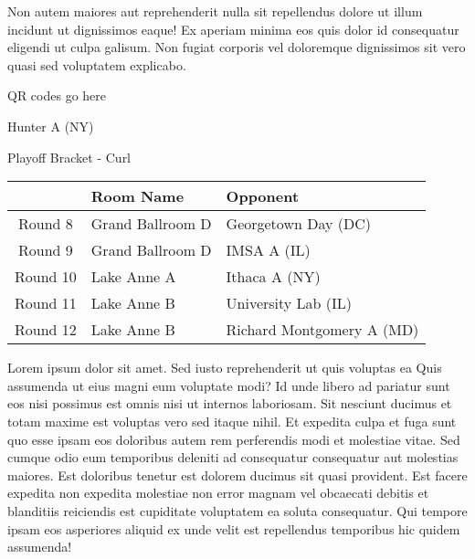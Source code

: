 \documentclass{article}%
\begin{document}
\newline%
Non autem maiores aut reprehenderit nulla sit repellendus dolore ut illum incidunt ut dignissimos eaque! Ex aperiam minima eos quis dolor id consequatur eligendi ut culpa galisum. Non fugiat corporis vel doloremque dignissimos sit vero quasi sed voluptatem explicabo.\newline%
\newline%
%
\vspace*{30pt}%
\begin{center}%
\begin{Huge}%
QR codes go here%
\end{Huge}%
\end{center}%
\newpage%
\begin{center}%
\begin{Huge}%
Hunter A (NY)%
\end{Huge}%
\vspace*{8pt}%
\linebreak%
\begin{Large}%
Playoff Bracket {-} Curl%
\end{Large}%
\end{center}%
\begin{tabularx}{\textwidth}{|c|Y|Y|}%
\hline%
&Room Name&Opponent\\%
\hline%
Round 8&Grand Ballroom D&Georgetown Day (DC)\\%
Round 9&Grand Ballroom D&IMSA A (IL)\\%
Round 10&Lake Anne A&Ithaca A (NY)\\%
Round 11&Lake Anne B&University Lab (IL)\\%
Round 12&Lake Anne B&Richard Montgomery A (MD)\\%
\hline%
\end{tabularx}%
\vspace*{8pt}%
\linebreak%
\newline%
\newline%
Lorem ipsum dolor sit amet. Sed iusto reprehenderit ut quis voluptas ea Quis assumenda ut eius magni eum voluptate modi? Id unde libero ad pariatur sunt eos nisi possimus est omnis nisi ut internos laboriosam. Sit nesciunt ducimus et totam maxime est voluptas vero sed itaque nihil. Et expedita culpa et fuga sunt quo esse ipsam eos doloribus autem rem perferendis modi et molestiae vitae.\newline%
\newline%
Sed cumque odio eum temporibus deleniti ad consequatur consequatur aut molestias maiores. Est doloribus tenetur est dolorem ducimus sit quasi provident. Est facere expedita non expedita molestiae non error magnam vel obcaecati debitis et blanditiis reiciendis est cupiditate voluptatem ea soluta consequatur. Qui tempore ipsam eos asperiores aliquid ex unde velit est repellendus temporibus hic quidem assumenda!\newline%
\end{document}

